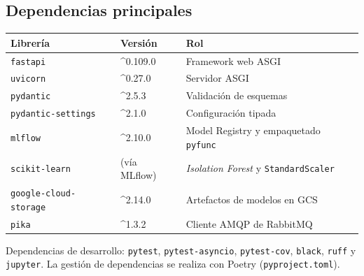 \subsection{Dependencias principales}

\begin{tabular}{@{}ll p{6.0cm}@{}}
  \toprule
  Librería & Versión & Rol \\
  \midrule
  \texttt{fastapi}        & \textasciicircum0.109.0 & Framework web ASGI \\
  \texttt{uvicorn}        & \textasciicircum0.27.0  & Servidor ASGI \\
  \texttt{pydantic}       & \textasciicircum2.5.3   & Validación de esquemas \\
  \texttt{pydantic-settings} & \textasciicircum2.1.0 & Configuración tipada \\
  \texttt{mlflow}         & \textasciicircum2.10.0  & Model Registry y empaquetado \texttt{pyfunc} \\
  \texttt{scikit-learn}   & (vía MLflow)            & \textit{Isolation Forest} y \texttt{StandardScaler} \\
  \texttt{google-cloud-storage} & \textasciicircum2.14.0 & Artefactos de modelos en GCS \\
  \texttt{pika}           & \textasciicircum1.3.2   & Cliente AMQP de RabbitMQ \\
  \bottomrule
\end{tabular}

\noindent Dependencias de desarrollo: \texttt{pytest}, \texttt{pytest-asyncio},
\texttt{pytest-cov}, \texttt{black}, \texttt{ruff} y \texttt{jupyter}. La gestión
de dependencias se realiza con Poetry (\texttt{pyproject.toml}).
